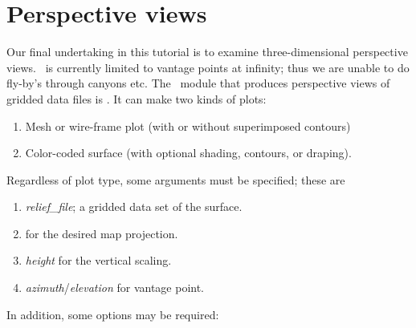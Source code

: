 \documentclass{report}
\begin{document}
\section{Perspective views}

Our final undertaking in this tutorial is to examine three-dimensional
perspective views.  \GMT\ is currently limited to vantage points at
infinity; thus we are unable to do fly-by's through canyons etc.  The
\GMT\ module that produces perspective views of gridded data files is
.  It can make two kinds of plots:

\begin{enumerate}

\item Mesh or wire-frame plot (with or without superimposed contours)

\item Color-coded surface (with optional shading, contours, or draping).

\end{enumerate}

Regardless of plot type, some arguments must be specified; these are

\begin{enumerate}

\item \emph{relief\_file}; a gridded data set of the surface.

\item {} for the desired map projection.

\item {}\emph{height} for the vertical scaling.

\item {}\emph{azimuth}/\emph{elevation} for vantage point.

\end{enumerate}


In addition, some options may be required:
\end{document}
